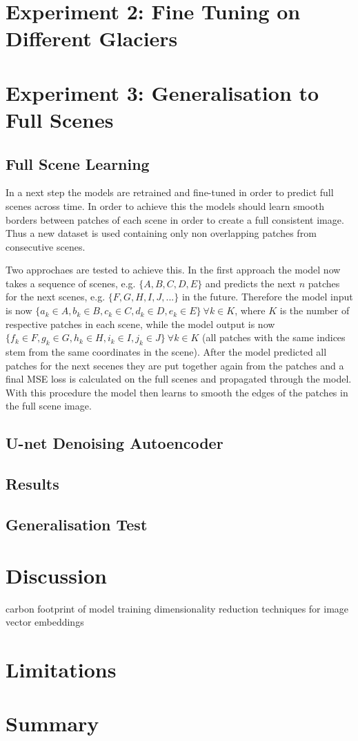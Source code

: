 \documentclass[12pt]{article}
\begin{document}
\section{Experiment 2: Fine Tuning on Different Glaciers}

\section{Experiment 3: Generalisation to Full Scenes}
\subsection{Full Scene Learning}
 In a next step the models are retrained and fine-tuned in order to predict full scenes across time. In order to achieve this the models should learn smooth borders between patches of each scene in order to create a full consistent image. Thus a new dataset is used containing only non overlapping patches from consecutive scenes. 
 
 Two approchaes are tested to achieve this. In the first approach the model now takes a sequence of scenes, e.g. $\{A, B, C, D, E\}$ and predicts the next $n$ patches for the next scenes, e.g. $\{F, G, H, I, J, ...\}$ in the future. Therefore the model input is now $\{a_k \in A, b_k \in B, c_k \in C, d_k \in D, e_k \in E\} \ \forall k \in K$, where $K$ is the number of respective patches in each scene, while the model output is now $\{f_k \in F, g_k \in G, h_k \in H, i_k \in I, j_k \in J\} \ \forall k \in K$ (all patches with the same indices stem from the same coordinates in the scene). After the model predicted all patches for the next secenes they are put together again from the patches and a final MSE loss is calculated on the full scenes and propagated through the model. With this procedure the model then learns to smooth the edges of the patches in the full scene image.
\subsection{U-net Denoising Autoencoder}
 
 

\subsection{Results}
\subsection{Generalisation Test}

\section{Discussion}
carbon footprint of model training
dimensionality reduction techniques for image vector embeddings
\section{Limitations}

\section{Summary}





\newpage



\end{document}
